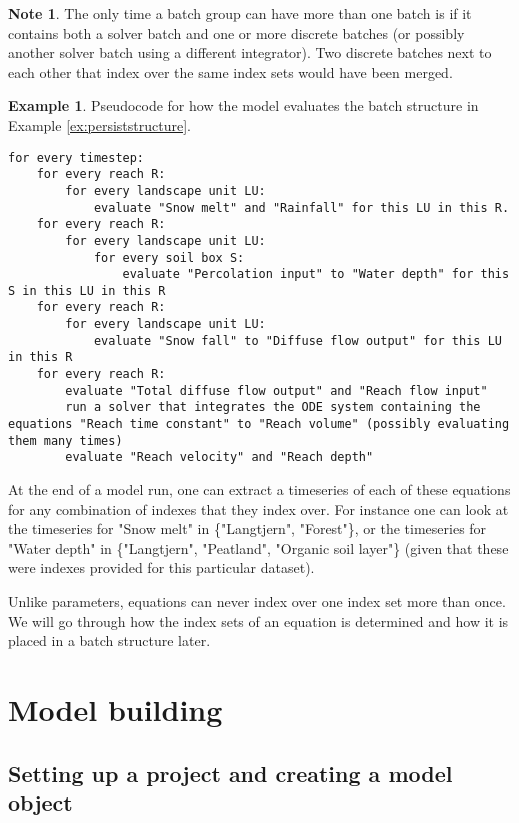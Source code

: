\documentclass[11pt]{article}
\theoremstyle{definition}
\newtheorem{mynote}{Note}
\newenvironment{note}%
  {\begin{lrbox}{\notebox}%
   \begin{minipage}{\dimexpr\linewidth-2\fboxsep}
   \begin{mynote}}%
  {\end{mynote}%
   \end{minipage}%
   \end{lrbox}%
   \begin{trivlist}
     \item[]\colorbox{silver}{\usebox\notebox}
   \end{trivlist}}
\newtheorem{myexample}{Example}
\newenvironment{example}%
  {\begin{lrbox}{\examplebox}%
   \begin{minipage}{\dimexpr\linewidth-2\fboxsep}
   \begin{myexample}}%
  {\end{myexample}%
   \end{minipage}%
   \end{lrbox}%
   \begin{trivlist}
     \item[]\colorbox{silver}{\usebox\examplebox}
   \end{trivlist}}
\begin{document}
\begin{note}
The only time a batch group can have more than one batch is if it contains both a solver batch and one or more discrete batches (or possibly another solver batch using a different integrator). Two discrete batches next to each other that index over the same index sets would have been merged.
\end{note}

\begin{example}\label{ex:pseucocode}
Pseudocode for how the model evaluates the batch structure in Example \ref{ex:persiststructure}.
\begin{lstlisting}[style=textstyle]
for every timestep:
	for every reach R:
		for every landscape unit LU:
			evaluate "Snow melt" and "Rainfall" for this LU in this R.
	for every reach R:
		for every landscape unit LU:
			for every soil box S:
				evaluate "Percolation input" to "Water depth" for this S in this LU in this R
	for every reach R:
		for every landscape unit LU:
			evaluate "Snow fall" to "Diffuse flow output" for this LU in this R
	for every reach R:
		evaluate "Total diffuse flow output" and "Reach flow input"
		run a solver that integrates the ODE system containing the equations "Reach time constant" to "Reach volume" (possibly evaluating them many times)
		evaluate "Reach velocity" and "Reach depth"
\end{lstlisting}	
\end{example}

At the end of a model run, one can extract a timeseries of each of these equations for any combination of indexes that they index over. For instance one can look at the timeseries for "Snow melt" in \{"Langtjern", "Forest"\}, or the timeseries for "Water depth" in \{"Langtjern", "Peatland", "Organic soil layer"\} (given that these were indexes provided for this particular dataset).

Unlike parameters, equations can never index over one index set more than once. We will go through how the index sets of an equation is determined and how it is placed in a batch structure later.

\section{Model building}\label{sec:modelbuilding}

\subsection{Setting up a project and creating a model object}
\end{document}
